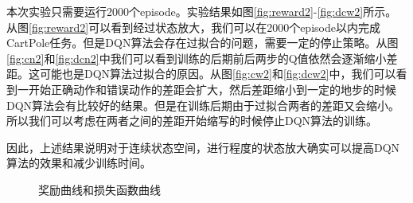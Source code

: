 \documentclass{article}
\begin{document}
        本次实验只需要运行2000个episode。实验结果如图\ref{fig:reward2}-\ref{fig:dcw2}所示。从图\ref{fig:reward2}可以看到经过状态放大，我们可以在2000个episode以内完成CartPole任务。但是DQN算法会存在过拟合的问题，需要一定的停止策略。从图\ref{fig:cn2}和\ref{fig:dcn2}中我们可以看到训练的后期前后两步的Q值依然会逐渐缩小差距。这可能也是DQN算法过拟合的原因。从图\ref{fig:cw2}和\ref{fig:dcw2}中，我们可以看到一开始正确动作和错误动作的差距会扩大，然后差距缩小到一定的地步的时候DQN算法会有比较好的结果。但是在训练后期由于过拟合两者的差距又会缩小。所以我们可以考虑在两者之间的差距开始缩写的时候停止DQN算法的训练。


        因此，上述结果说明对于连续状态空间，进行程度的状态放大确实可以提高DQN算法的效果和减少训练时间。
        \begin{figure}[htb]
            \centering
            \caption{奖励曲线和损失函数曲线}
        \end{figure}
\end{document}
